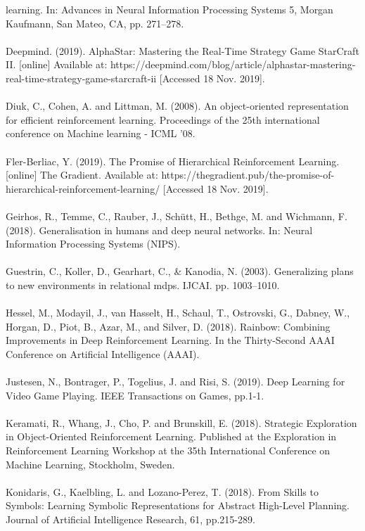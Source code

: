 \documentclass[notitlepage,a4paper,11pt]{article}
\begin{document}
learning. In: Advances in Neural Information Processing
Systems 5, Morgan Kaufmann, San Mateo, CA, pp. 271–278.\\\\
Deepmind. (2019). AlphaStar: Mastering the Real-Time Strategy Game StarCraft II. [online] Available at: https://deepmind.com/blog/article/alphastar-mastering-real-time-strategy-game-starcraft-ii [Accessed 18 Nov. 2019].\\\\
Diuk, C., Cohen, A. and Littman, M. (2008). An object-oriented representation for efficient reinforcement learning. Proceedings of the 25th international conference on Machine learning - ICML '08.\\\\
Fler-Berliac, Y. (2019). The Promise of Hierarchical Reinforcement Learning. [online] The Gradient. Available at: https://thegradient.pub/the-promise-of-hierarchical-reinforcement-learning/ [Accessed 18 Nov. 2019].\\\\
Geirhos, R., Temme, C., Rauber, J., Schütt, H., Bethge, M. and Wichmann, F. (2018). Generalisation in humans and deep neural networks. In: Neural Information Processing Systems (NIPS).\\\\
Guestrin, C., Koller, D., Gearhart, C., \& Kanodia, N. (2003). Generalizing plans to new environments in relational mdps. IJCAI. pp. 1003–1010.\\\\
Hessel, M., Modayil, J., van Hasselt, H., Schaul, T., Ostrovski, G., Dabney, W., Horgan, D., Piot, B., Azar, M., and Silver, D. (2018). Rainbow: Combining Improvements in Deep Reinforcement Learning. In the Thirty-Second AAAI Conference on Artificial Intelligence (AAAI).\\\\
Justesen, N., Bontrager, P., Togelius, J. and Risi, S. (2019). Deep Learning for Video Game Playing. IEEE Transactions on Games, pp.1-1.\\\\
Keramati, R., Whang, J., Cho, P. and Brunskill, E. (2018). Strategic Exploration in Object-Oriented Reinforcement Learning. Published at the Exploration in Reinforcement Learning Workshop
at the 35th International Conference on Machine Learning,
Stockholm, Sweden.\\\\
Konidaris, G., Kaelbling, L. and Lozano-Perez, T. (2018). From Skills to Symbols: Learning Symbolic Representations for Abstract High-Level Planning. Journal of Artificial Intelligence Research, 61, pp.215-289.\\\\
\end{document}
